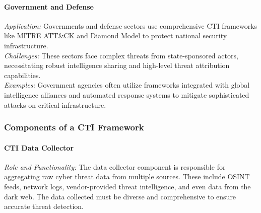 \documentclass[a4paper,twoside,12pt]{report}
\begin{document}
\paragraph{Government and Defense \citet{bin2024maximizing}}
\textit{Application:} Governments and defense sectors use comprehensive CTI frameworks like MITRE ATT\&CK and Diamond Model to protect national security infrastructure. \\
\textit{Challenges:} These sectors face complex threats from state-sponsored actors, necessitating robust intelligence sharing and high-level threat attribution capabilities. \\
\textit{Examples:} Government agencies often utilize frameworks integrated with global intelligence alliances and automated response systems to mitigate sophisticated attacks on critical infrastructure.

\subsubsection*{Components of a CTI Framework}
\paragraph{CTI Data Collector}
\textit{Role and Functionality:} The data collector component is responsible for aggregating raw cyber threat data from multiple sources. These include OSINT feeds, network logs, vendor-provided threat intelligence, and even data from the dark web. The data collected must be diverse and comprehensive to ensure accurate threat detection.
\end{document}
